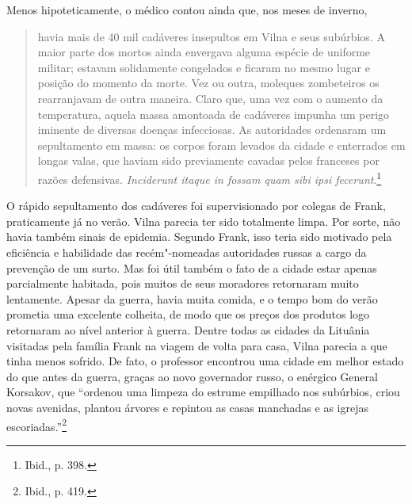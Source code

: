 Menos hipoteticamente, o médico contou ainda que, nos meses de inverno,

%

\begin{quote}
havia mais de 40 mil cadáveres insepultos em Vilna e seus subúrbios. A
maior parte dos mortos ainda envergava alguma espécie de uniforme
militar; estavam solidamente congelados e ficaram no mesmo lugar e
posição do momento da morte. Vez ou outra, moleques zombeteiros os
rearranjavam de outra maneira. Claro que, uma vez com o aumento da
temperatura, aquela massa amontoada de cadáveres impunha um perigo
iminente de diversas doenças infecciosas. As autoridades ordenaram um
sepultamento em massa: os corpos foram levados da cidade e enterrados em
longas valas, que haviam sido previamente cavadas pelos franceses por
razões defensivas. \textit{Inciderunt itaque in fossam quam sibi ipsi
fecerunt}.\footnote{Ibid., p. 398.}
\end{quote}

O rápido sepultamento dos cadáveres foi supervisionado por colegas de
Frank, praticamente já no verão. Vilna parecia ter sido totalmente
limpa. Por sorte, não havia também sinais de epidemia. Segundo Frank,
isso teria sido motivado pela eficiência e habilidade das recém"-nomeadas
autoridades russas a cargo da prevenção de um surto. Mas foi útil também
o fato de a cidade estar apenas parcialmente habitada, pois muitos de
seus moradores retornaram muito lentamente. Apesar da guerra, havia
muita comida, e o tempo bom do verão prometia uma excelente colheita, de
modo que os preços dos produtos logo retornaram ao nível anterior à
guerra. Dentre todas as cidades da Lituânia visitadas pela família Frank
na viagem de volta para casa, Vilna parecia a que tinha menos sofrido.
De fato, o professor encontrou uma cidade em melhor estado do que antes
da guerra, graças ao novo governador russo, o enérgico General Korsakov,
que ``ordenou uma limpeza do estrume empilhado nos subúrbios, criou
novas avenidas, plantou árvores e repintou as casas manchadas e as
igrejas escoriadas.''\footnote{Ibid., p. 419.}


